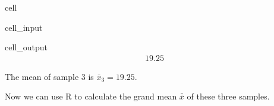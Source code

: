 \documentclass[letterpaper,10pt,english]{jupyterBook}
\begin{document}
\begin{sphinxuseclass}{cell}\begin{sphinxVerbatimInput}

\begin{sphinxuseclass}{cell_input}
\begin{sphinxVerbatim}[commandchars=\\\{\}]

\end{sphinxVerbatim}

\end{sphinxuseclass}\end{sphinxVerbatimInput}
\begin{sphinxVerbatimOutput}

\begin{sphinxuseclass}{cell_output}\begin{equation*}
\begin{split}19.25\end{split}
\end{equation*}
\end{sphinxuseclass}\end{sphinxVerbatimOutput}

\end{sphinxuseclass}
\sphinxAtStartPar
The mean of sample \(3\) is \(\bar{x}_3 = 19.25\).

\sphinxAtStartPar
Now we can use R to calculate the grand mean \(\bar{\bar{x}}\) of these three samples.
\end{document}
